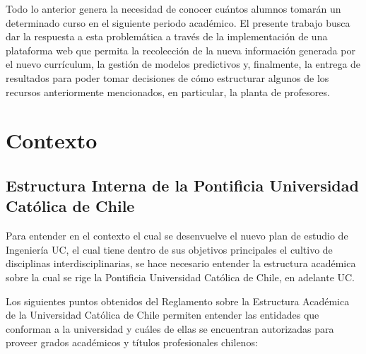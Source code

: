 Todo lo anterior genera la necesidad de conocer cuántos alumnos tomarán un determinado curso en el siguiente periodo académico. El presente trabajo busca dar la respuesta a esta problemática a través de la implementación de una plataforma web que permita la recolección de la nueva información generada por el nuevo currículum, la gestión de modelos predictivos y, finalmente, la entrega de resultados para poder tomar decisiones de cómo estructurar algunos de los recursos anteriormente mencionados, en particular, la planta de profesores.

\section{Contexto \label{sec:context}}

\subsection{Estructura Interna de la Pontificia Universidad Católica de Chile \label{sec:internal_structure}}

Para entender en el contexto el cual se desenvuelve el nuevo plan de estudio de Ingeniería UC, el cual tiene dentro de sus objetivos principales el cultivo de disciplinas
interdisciplinarias, se hace necesario entender la estructura académica sobre la cual se rige la Pontificia Universidad Católica de Chile, en adelante UC.

Los siguientes puntos obtenidos del Reglamento sobre la Estructura Académica de la Universidad Católica de Chile \cite{structure} permiten entender las entidades que conforman a la universidad y cuáles de ellas se encuentran autorizadas para proveer grados académicos y títulos profesionales chilenos:

